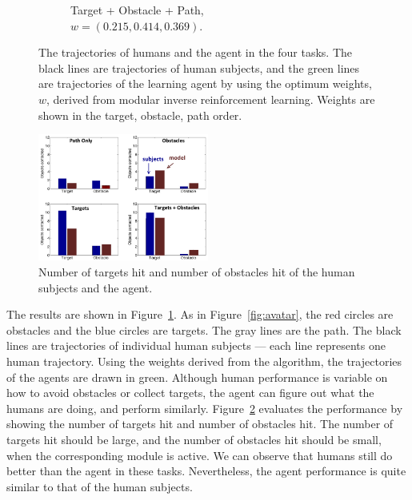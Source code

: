 \documentclass[11pt]{article} %
\begin{document}
\begin{figure}[h]
\begin{subfigure}[b]{0.24\textwidth}
\caption{Target + Obstacle + Path, \\$w = (0.215, 0.414, 0.369)$. }
\end{subfigure}
\caption{The trajectories of humans and the agent in the four tasks. The
black lines are trajectories of human subjects, and the green lines are
trajectories of the learning agent by using the optimum weights, $w$, derived
from modular inverse reinforcement learning. Weights are shown in the target,
obstacle, path order.}

\label{fig:exp}
\end{figure}

\begin{figure}[h]
\centering
\includegraphics[width=0.5\textwidth]{contactStats.png}
\caption{Number of targets hit and number of obstacles hit of the human subjects
and the agent.}
\label{fig:stats}
\end{figure}

The results are shown in Figure~\ref{fig:exp}. As in Figure~\ref{fig:avatar},
the red circles are obstacles and the blue circles are targets. The gray lines are
the path. The black lines are trajectories of individual human subjects --- each line represents one
human trajectory.
Using the weights derived from the algorithm, the trajectories of the agents are
drawn in green. Although human performance is variable on how to avoid obstacles or collect
targets, the agent can figure out what the humans are doing, and perform 
similarly. Figure~\ref{fig:stats} evaluates the
performance by showing the number of targets hit and number of obstacles hit.
The number of targets hit should be large, and the number of obstacles hit
should be small, when the corresponding module is active.
We can observe that humans still do better than the agent in these tasks.
Nevertheless, the agent performance is quite similar to that of the human subjects.
\end{document}
